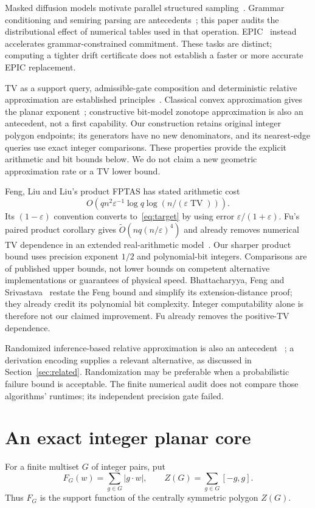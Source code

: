 \documentclass[11pt]{article}
\newcommand{\TV}{\operatorname{TV}}
\begin{document}
Masked diffusion models motivate parallel structured sampling~\cite{mdlm}.
Grammar conditioning and semiring parsing are antecedents~\cite{rivaud,goodman};
this paper audits the distributional effect of numerical tables used in that
operation. EPIC~\cite{epic} instead accelerates grammar-constrained commitment.
These tasks are distinct; computing a tighter drift certificate does not
establish a faster or more accurate EPIC replacement.

TV as a support query, admissible-gate composition and deterministic relative
approximation are established principles~\cite{fu}. Classical convex
approximation gives the planar exponent~\cite{dudley,matousek}; constructive
bit-model zonotope approximation is also an antecedent, not a first capability. Our construction
retains original integer polygon endpoints; its generators have no new
denominators, and its nearest-edge queries use exact integer comparisons.
These properties provide the explicit arithmetic and bit bounds below.
We do not claim a new geometric approximation rate or a TV lower bound.

Feng, Liu and Liu's product FPTAS has stated arithmetic cost~\cite[Theorem 1]{feng}
\[
 O(qn^2\varepsilon^{-1}\log q\log(n/(\varepsilon\TV))).
\]
Its $(1-\varepsilon)$ convention converts to~\eqref{eq:target} by using
error $\varepsilon/(1+\varepsilon)$. Fu's paired product corollary gives
$\widetilde O(nq(n/\varepsilon)^4)$ and already removes numerical TV dependence
in an extended real-arithmetic model~\cite[Corollary 1.4]{fu}.
Our sharper product bound uses precision exponent $1/2$ and polynomial-bit
integers. Comparisons are of published upper bounds, not lower bounds on
competent alternative implementations or guarantees of physical speed.
Bhattacharyya, Feng and Srivastava~\cite[Sections 2--3]{gaussian} restate the
Feng bound and simplify its extension-distance proof; they already credit
its polynomial bit complexity. Integer computability alone is therefore
not our claimed improvement. Fu already removes the positive-TV dependence.

Randomized inference-based relative approximation is also an antecedent
~\cite{inference}; a derivation encoding supplies a relevant alternative,
as discussed in Section~\ref{sec:related}. Randomization may be preferable
when a probabilistic failure bound is acceptable. The finite numerical audit
does not compare those algorithms' runtimes; its independent precision gate failed.

\section{An exact integer planar core}
For a finite multiset $G$ of integer pairs, put
\[
 F_G(w)=\sum_{g\in G}|g\cdot w|,
 \qquad Z(G)=\sum_{g\in G}[-g,g].
\]
Thus $F_G$ is the support function of the centrally symmetric polygon $Z(G)$.
\end{document}
